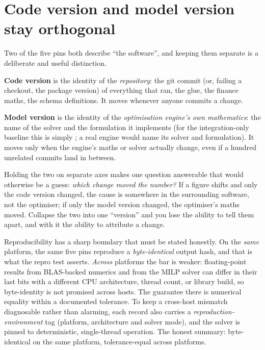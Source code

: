 \section{Code version and model version stay orthogonal}

Two of the five pins both describe ``the software'', and keeping them separate is a deliberate and useful distinction.

\textbf{Code version} is the identity of the \emph{repository}: the git commit (or, failing a checkout, the package version) of everything that ran, the glue, the finance maths, the schema definitions. It moves whenever anyone commits a change.

\textbf{Model version} is the identity of the \emph{optimisation engine's own mathematics}: the name of the solver and the formulation it implements (for the integration-only baseline this is simply ; a real engine would name its solver and formulation). It moves only when the engine's maths or solver actually change, even if a hundred unrelated commits land in between.

Holding the two on separate axes makes one question answerable that would otherwise be a guess: \emph{which change moved the number?} If a figure shifts and only the code version changed, the cause is somewhere in the surrounding software, not the optimiser; if only the model version changed, the optimiser's maths moved. Collapse the two into one ``version'' and you lose the ability to tell them apart, and with it the ability to attribute a change.

\begin{caution}
Reproducibility has a sharp boundary that must be stated honestly. On the \emph{same} platform, the same five pins reproduce a \emph{byte-identical} output hash, and that is what the repro test asserts. \emph{Across} platforms the bar is weaker: floating-point results from BLAS-backed numerics and from the MILP solver can differ in their last bits with a different CPU architecture, thread count, or library build, so byte-identity is not promised across hosts. The guarantee there is numerical equality within a documented tolerance. To keep a cross-host mismatch diagnosable rather than alarming, each record also carries a \emph{reproduction-environment} tag (platform, architecture and solver mode), and the solver is pinned to deterministic, single-thread operation. The honest summary: byte-identical on the same platform, tolerance-equal across platforms.
\end{caution}

